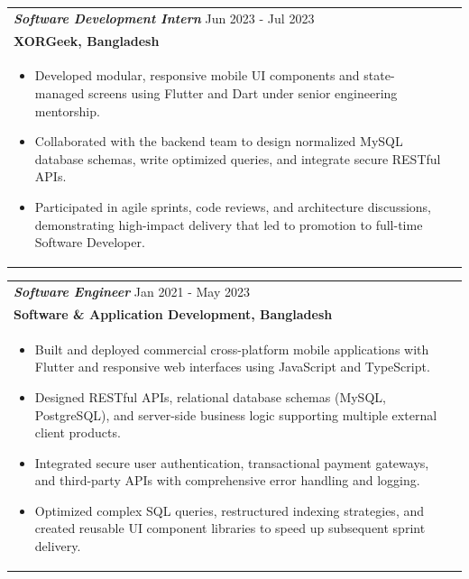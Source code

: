 \documentclass[a4paper,8pt]{article}
\begin{document}
\vspace{7pt}

\begin{tabularx}{\linewidth}{ @{}l r@{} }
\textbf{\textit{Software Development Intern}} \hfill Jun 2023 - Jul 2023 \\[2pt]
\textbf{{XORGeek, Bangladesh}} \hfill \\[3pt]
\begin{minipage}[t]{\linewidth}
\begin{itemize}[nosep,after=\strut, leftmargin=1.5em, itemsep=3pt]
\item Developed modular, responsive mobile UI components and state-managed screens using Flutter and Dart under senior engineering mentorship.
\item Collaborated with the backend team to design normalized MySQL database schemas, write optimized queries, and integrate secure RESTful APIs.
\item Participated in agile sprints, code reviews, and architecture discussions, demonstrating high-impact delivery that led to promotion to full-time Software Developer.
\end{itemize}
\end{minipage}
\end{tabularx}

\vspace{7pt}

\begin{tabularx}{\linewidth}{ @{}l r@{} }
\textbf{\textit{Software Engineer}} \hfill Jan 2021 - May 2023 \\[2pt]
\textbf{{Software \& Application Development, Bangladesh}} \hfill \\[3pt]
\begin{minipage}[t]{\linewidth}
\begin{itemize}[nosep,after=\strut, leftmargin=1.5em, itemsep=3pt]
\item Built and deployed commercial cross-platform mobile applications with Flutter and responsive web interfaces using JavaScript and TypeScript.
\item Designed RESTful APIs, relational database schemas (MySQL, PostgreSQL), and server-side business logic supporting multiple external client products.
\item Integrated secure user authentication, transactional payment gateways, and third-party APIs with comprehensive error handling and logging.
\item Optimized complex SQL queries, restructured indexing strategies, and created reusable UI component libraries to speed up subsequent sprint delivery.
\end{itemize}
\end{minipage}
\end{tabularx}
\end{document}
